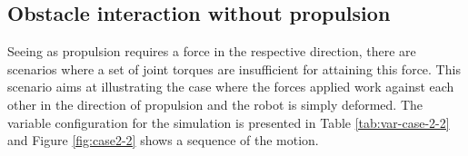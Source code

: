 \subsection{Obstacle interaction without propulsion}\label{subseq:case22}

Seeing as propulsion requires a force in the respective direction, there are scenarios where a set of joint torques are insufficient for attaining this force. This scenario aims at illustrating the case where the forces applied work against each other in the direction of propulsion and the robot is simply deformed. The variable configuration for the simulation is presented in Table \ref{tab:var-case-2-2} and Figure \ref{fig:case2-2} shows a sequence of the motion.

\begin{figure}[H]
    \centering
    
    \hfil
    

\end{figure}
